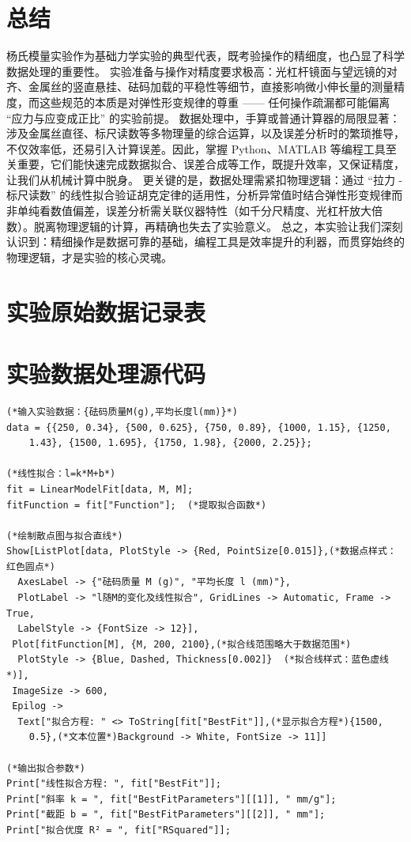 \documentclass[11pt]{article}
\begin{document}
\section{总结}
杨氏模量实验作为基础力学实验的典型代表，既考验操作的精细度，也凸显了科学数据处理的重要性。
实验准备与操作对精度要求极高：光杠杆镜面与望远镜的对齐、金属丝的竖直悬挂、砝码加载的平稳性等细节，直接影响微小伸长量的测量精度，而这些规范的本质是对弹性形变规律的尊重 —— 任何操作疏漏都可能偏离 “应力与应变成正比” 的实验前提。
数据处理中，手算或普通计算器的局限显著：涉及金属丝直径、标尺读数等多物理量的综合运算，以及误差分析时的繁琐推导，不仅效率低，还易引入计算误差。因此，掌握 Python、MATLAB 等编程工具至关重要，它们能快速完成数据拟合、误差合成等工作，既提升效率，又保证精度，让我们从机械计算中脱身。
更关键的是，数据处理需紧扣物理逻辑：通过 “拉力 - 标尺读数” 的线性拟合验证胡克定律的适用性，分析异常值时结合弹性形变规律而非单纯看数值偏差，误差分析需关联仪器特性（如千分尺精度、光杠杆放大倍数）。脱离物理逻辑的计算，再精确也失去了实验意义。
总之，本实验让我们深刻认识到：精细操作是数据可靠的基础，编程工具是效率提升的利器，而贯穿始终的物理逻辑，才是实验的核心灵魂。
\section{实验原始数据记录表}

\section{实验数据处理源代码}
\begin{lstlisting}
(*输入实验数据：{砝码质量M(g),平均长度l(mm)}*)
data = {{250, 0.34}, {500, 0.625}, {750, 0.89}, {1000, 1.15}, {1250, 
    1.43}, {1500, 1.695}, {1750, 1.98}, {2000, 2.25}};

(*线性拟合：l=k*M+b*)
fit = LinearModelFit[data, M, M];
fitFunction = fit["Function"];  (*提取拟合函数*)

(*绘制散点图与拟合直线*)
Show[ListPlot[data, PlotStyle -> {Red, PointSize[0.015]},(*数据点样式：红色圆点*)
  AxesLabel -> {"砝码质量 M (g)", "平均长度 l (mm)"}, 
  PlotLabel -> "l随M的变化及线性拟合", GridLines -> Automatic, Frame -> True, 
  LabelStyle -> {FontSize -> 12}], 
 Plot[fitFunction[M], {M, 200, 2100},(*拟合线范围略大于数据范围*)
  PlotStyle -> {Blue, Dashed, Thickness[0.002]}  (*拟合线样式：蓝色虚线*)], 
 ImageSize -> 600, 
 Epilog -> 
  Text["拟合方程: " <> ToString[fit["BestFit"]],(*显示拟合方程*){1500, 
    0.5},(*文本位置*)Background -> White, FontSize -> 11]]

(*输出拟合参数*)
Print["线性拟合方程: ", fit["BestFit"]];
Print["斜率 k = ", fit["BestFitParameters"][[1]], " mm/g"];
Print["截距 b = ", fit["BestFitParameters"][[2]], " mm"];
Print["拟合优度 R² = ", fit["RSquared"]];
\end{lstlisting}
\end{document}
